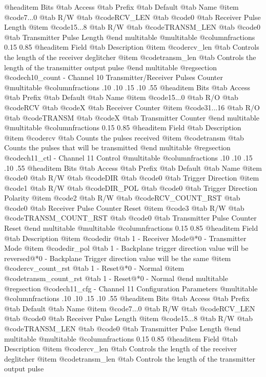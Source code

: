 @headitem Bits @tab Access @tab Prefix @tab Default @tab Name
@item @code{7...0}
@tab R/W @tab
@code{RCV_LEN}
@tab @code{0} @tab 
Receiver Pulse Length
@item @code{15...8}
@tab R/W @tab
@code{TRANSM_LEN}
@tab @code{0} @tab 
Transmitter Pulse Length
@end multitable
@multitable @columnfractions 0.15 0.85
@headitem Field @tab Description
@item @code{rcv_len} @tab Controls the length of the receiver deglitcher
@item @code{transm_len} @tab Controls the length of the transmitter output pulse
@end multitable
@regsection @code{ch10_count} - Channel 10 Transmitter/Receiver Pulses Counter
@multitable @columnfractions .10 .10 .15 .10 .55
@headitem Bits @tab Access @tab Prefix @tab Default @tab Name
@item @code{15...0}
@tab R/O @tab
@code{RCV}
@tab @code{X} @tab 
Receiver Counter
@item @code{31...16}
@tab R/O @tab
@code{TRANSM}
@tab @code{X} @tab 
Transmitter Counter
@end multitable
@multitable @columnfractions 0.15 0.85
@headitem Field @tab Description
@item @code{rcv} @tab Counts the pulses received
@item @code{transm} @tab Counts the pulses that will be transmitted
@end multitable
@regsection @code{ch11_ctl} - Channel 11 Control
@multitable @columnfractions .10 .10 .15 .10 .55
@headitem Bits @tab Access @tab Prefix @tab Default @tab Name
@item @code{0}
@tab R/W @tab
@code{DIR}
@tab @code{0} @tab 
Trigger Direction
@item @code{1}
@tab R/W @tab
@code{DIR_POL}
@tab @code{0} @tab 
Trigger Direction Polarity
@item @code{2}
@tab R/W @tab
@code{RCV_COUNT_RST}
@tab @code{0} @tab 
Receiver Pulse Counter Reset
@item @code{3}
@tab R/W @tab
@code{TRANSM_COUNT_RST}
@tab @code{0} @tab 
Transmitter Pulse Counter Reset
@end multitable
@multitable @columnfractions 0.15 0.85
@headitem Field @tab Description
@item @code{dir} @tab 1 - Receiver Mode@*0 - Transmitter Mode
@item @code{dir_pol} @tab 1 - Backplane trigger direction value will be reversed@*0 - Backplane Trigger direction value will be the same
@item @code{rcv_count_rst} @tab 1 - Reset@*0 - Normal
@item @code{transm_count_rst} @tab 1 - Reset@*0 - Normal
@end multitable
@regsection @code{ch11_cfg} - Channel 11 Configuration Parameters
@multitable @columnfractions .10 .10 .15 .10 .55
@headitem Bits @tab Access @tab Prefix @tab Default @tab Name
@item @code{7...0}
@tab R/W @tab
@code{RCV_LEN}
@tab @code{0} @tab 
Receiver Pulse Length
@item @code{15...8}
@tab R/W @tab
@code{TRANSM_LEN}
@tab @code{0} @tab 
Transmitter Pulse Length
@end multitable
@multitable @columnfractions 0.15 0.85
@headitem Field @tab Description
@item @code{rcv_len} @tab Controls the length of the receiver deglitcher
@item @code{transm_len} @tab Controls the length of the transmitter output pulse
